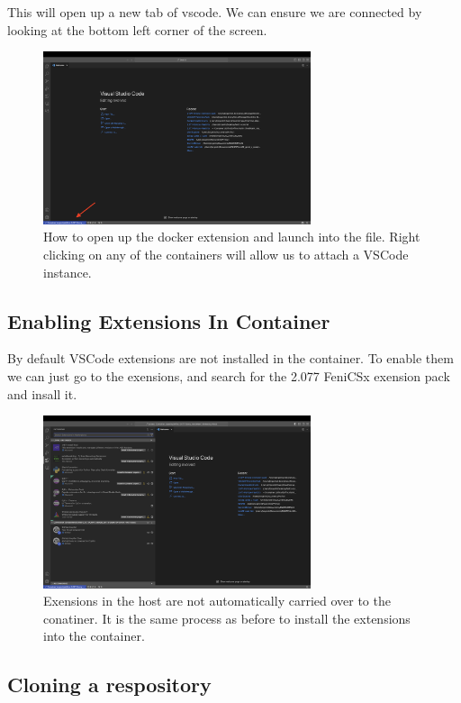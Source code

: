 \documentclass[final]{article}
\numberwithin{equation}{section}
\theoremstyle{remarkStyle}
\begin{document}
This will open up a new tab of vscode. We can ensure we are connected by looking at the bottom left corner of the screen.
\begin{figure}[H]
  \centering
  \includegraphics[width=0.7\textwidth]{VsCode-Connected.png}
  \caption{How to open up the docker extension and launch into the file. Right clicking on any of the containers will allow us to attach a VSCode instance. }%
  \label{fig:vsDocker-connected}%
\end{figure}

\subsection{Enabling Extensions In Container}
By default VSCode extensions are not installed in the container. To enable them we can just go to the exensions, and search for the 2.077 FeniCSx exension pack and insall it.

\begin{figure}[H]
  \centering
  \includegraphics[width=0.7\textwidth]{Extensions-Container.png}
  \caption{Exensions in the host are not automatically carried over to the conatiner. It is the same process as before to install the extensions into the container. }%
  \label{fig:vsDocker-extension}%
\end{figure}

\subsection{Cloning a respository}
\end{document}
